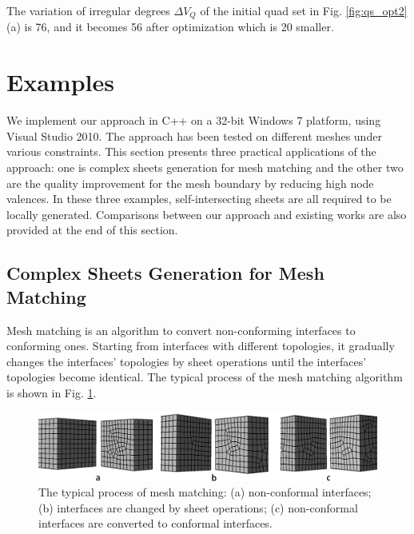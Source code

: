 \documentclass[final,5p,times,twocolumn]{elsarticle}
\begin{document}
The variation of irregular degrees $\Delta V_Q$ of the initial quad set in Fig. \ref{fig:qs_opt2}(a) is 76, and it becomes 56 after optimization which is 20 smaller.

\section{Examples}
\label{sec:examples}
We implement our approach in C++ on a 32-bit Windows 7 platform, using Visual Studio 2010. The approach has been tested on different meshes under various constraints. This section presents three practical applications of the approach: one is complex sheets generation for mesh matching and the other two are the quality improvement for the mesh boundary by reducing high node valences. In these three examples, self-intersecting sheets are all required to be locally generated. Comparisons between our approach and existing works are also provided at the end of this section.

\subsection{Complex Sheets Generation for Mesh Matching}
\label{sec:mesh_matching}
Mesh matching is an algorithm to convert non-conforming interfaces to conforming ones\cite{Chen:2015kf,Staten2010d}. Starting from interfaces with different topologies, it gradually changes the interfaces' topologies by sheet operations until the interfaces' topologies become identical. The typical process of the mesh matching algorithm is shown in Fig. \ref{fig:mesh_matching_exam}.

\begin{figure}[htbp]
\begin{center}
\includegraphics[width=16.5cm]{mesh_matching.png}
\caption{The typical process of mesh matching: (a) non-conformal interfaces; (b) interfaces are changed by sheet operations; (c) non-conformal interfaces are converted to conformal interfaces.}
\label{fig:mesh_matching_exam}
\end{center}
\end{figure}
\end{document}
